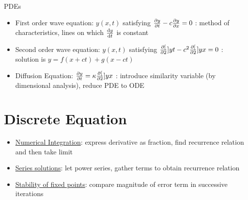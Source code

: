PDEs
\begin{itemize}
      \item First order wave equation: $y(x,t)$ satisfying $\frac{\partial{y}}{\partial{t}} - c\frac{\partial{y}}{\partial{x}}=0$ : method of characteristics, lines on which $\frac{\mathrm{d}{y}}{\mathrm{d}{t}}$ is constant
      \item Second order wave equation: $y(x,t)$ satisfying $\frac{\partial{[}}{\partial{2}}]{y}{t} - c^2\frac{\partial{[}}{\partial{2}}]{y}{x}=0$ : solution is $y = f(x+ct) + g(x-ct) $
      \item Diffusion Equation: $\frac{\partial{y}}{\partial{t}} =\kappa \frac{\partial{[}}{\partial{2}}]{y}{x}$ : introduce similarity variable (by dimensional analysis), reduce PDE to ODE
\end{itemize}

\section{Discrete Equation}
\begin{itemize}
      \item \underline{Numerical Integration}: express derivative as fraction, find recurrence relation and then take limit
      \item \underline{Series solutions}: let power series, gather terms to obtain recurrence relation
      \item \underline{Stability of fixed points}: compare magnitude of error term in successive iterations
\end{itemize}
